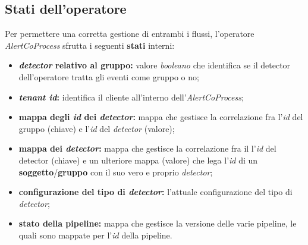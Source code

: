 \subsection{Stati dell'operatore}\label{sec:stati-alertcoprocess}
Per permettere una corretta gestione di entrambi i flussi, l'operatore \textit{AlertCoProcess} sfrutta i seguenti \textbf{stati} interni:
\begin{itemize}
		\item{\textbf{\textit{detector} relativo al gruppo:} valore \textit{booleano} che identifica se il detector dell'operatore tratta gli eventi come gruppo o no;}
		\item{\textbf{\textit{tenant id}:} identifica il cliente all'interno dell'\textit{AlertCoProcess};}
		\item{\textbf{mappa degli \textit{id} dei \textit{detector}:} mappa che gestisce la correlazione fra l'\textit{id} del gruppo (chiave) e l'\textit{id} del \textit{detector} (valore);}
		\item{\textbf{mappa dei \textit{detector}:} mappa che gestisce la correlazione fra il l'\textit{id} del detector (chiave) e un ulteriore mappa (valore) che lega l'\textit{id} di un \textbf{soggetto}/\textbf{gruppo} con il suo vero e proprio \textit{detector};}
		\item{\textbf{configurazione del tipo di \textit{detector}:} l'attuale configurazione del tipo di \textit{detector};}
		\item{\textbf{stato della \gls{pipeline}:} mappa che gestisce la versione delle varie \gls{pipeline}, le quali sono mappate per l'\textit{id} della \gls{pipeline}.}
\end{itemize}

